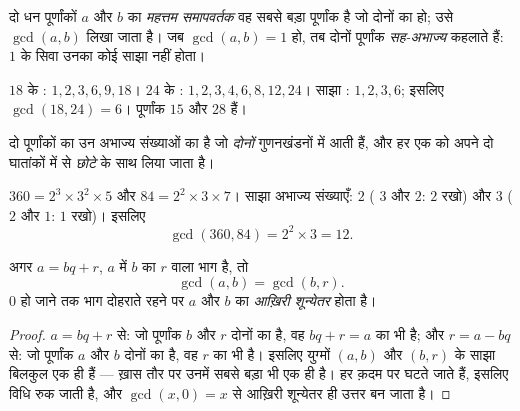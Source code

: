 \begin{definition}\label{def:g9:arith:gcd}
दो धन पूर्णांकों $a$ और $b$ का \emph{महत्तम समापवर्तक}
वह सबसे बड़ा पूर्णांक है जो दोनों का  हो; उसे $\gcd(a, b)$ लिखा
जाता है। जब $\gcd(a, b) = 1$ हो, तब दोनों पूर्णांक
\emph{सह-अभाज्य} कहलाते हैं: $1$ के सिवा उनका कोई
साझा  नहीं होता।
\end{definition}

\begin{example}
$18$ के : $1, 2, 3, 6, 9, 18$। $24$ के : $1, 2, 3, 4, 6, 8,
12, 24$। साझा : $1, 2, 3, 6$; इसलिए $\gcd(18, 24) = 6$। पूर्णांक
$15$ और $28$  हैं।
\end{example}

\begin{proposition}\label{prop:g9:arith:gcdfact}
दो पूर्णांकों का  उन अभाज्य संख्याओं का  है जो
\emph{दोनों} गुणनखंडनों में आती हैं, और हर एक को अपने दो घातांकों में
से \emph{छोटे}  के साथ लिया जाता है।
\end{proposition}
\admitted

\begin{example}\label{ex:g9:arith:gcdfact}
$360 = 2^3 \times 3^2 \times 5$ और $84 = 2^2 \times 3 \times 7$। साझा
अभाज्य संख्याएँ: $2$ ( $3$ और $2$: $2$ रखो) और $3$ ( $2$
और $1$: $1$ रखो)। इसलिए
\[
\gcd(360, 84) = 2^2 \times 3 = 12 .
\]
\end{example}

\begin{theorem}[यूक्लिड की विधि]\label{thm:g9:arith:euclidalgo}
अगर $a = bq + r$, $a$ में $b$ का  $r$ वाला भाग है, तो
\[
\gcd(a, b) = \gcd(b, r).
\]
 $0$ हो जाने तक भाग दोहराते रहने पर $a$ और $b$ का  \emph{आख़िरी शून्येतर } होता है।
\end{theorem}

\begin{proof}
$a = bq + r$ से: जो पूर्णांक $b$ और $r$ दोनों का  है, वह
$bq + r = a$ का भी  है; और $r = a - bq$ से: जो पूर्णांक $a$ और
$b$ दोनों का  है, वह $r$ का भी  है। इसलिए युग्मों $(a, b)$
और $(b, r)$ के साझा  बिलकुल एक ही हैं --- ख़ास तौर पर उनमें सबसे
बड़ा भी एक ही है।  हर क़दम पर घटते जाते हैं, इसलिए विधि रुक जाती
है, और $\gcd(x, 0) = x$ से आख़िरी शून्येतर  ही उत्तर बन जाता है।
\end{proof}

